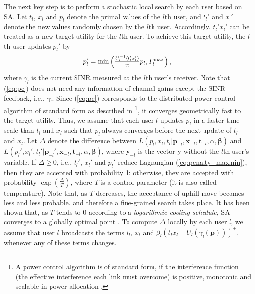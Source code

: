 \documentclass[10pt,journal,letterpaper,compsoc]{IEEEtran}
\begin{document}
{{The next key step is to perform a stochastic local search by each user based on SA. Let $t_l$, $x_l$ and $p_l$ denote the primal values of the $l$th user, and $t_l'$ and $x_l'$ denote the new values randomly chosen by the $l$th user. Accordingly, $t_l'x_l'$ can be treated as a new target utility for the $l$th user. To achieve this target utility, the $l$th user updates $p_l'$ by
\begin{equation}\begin{array}
[c]{lll}p_l'=\min\left(\frac{U_l^{-1}(t_l'x_l')}{\gamma_l}p_l,P_l^{\max}\right),
\end{array}
\label{eq:pc}
\end{equation}
where $\gamma_l$ is the current SINR measured at the $l$th user's receiver. Note that (\ref{eq:pc}) does not need any information of channel gains except the SINR feedback, i.e., $\gamma_l$. Since (\ref{eq:pc}) corresponds to the distributed power control algorithm of standard form as described in \cite{yates:1995}\footnote{A power control algorithm is of standard form, if the interference function (the effective interference each link must overcome) is positive, monotonic and scalable in power allocation \cite{yates:1995}.}, it converges geometrically fast to the target utility. Thus, we assume that each user $l$ updates $p_l$ in a faster time-scale than $t_l$ and $x_l$ such that $p_l$ always converges before the next update of $t_l$ and $x_l$.
Let $\Delta$ denote the difference between $L(p_l,x_l,t_l|\mathbf{p}_{-l},\mathbf{x}_{-l},\mathbf{t}_{-l},\alpha,\boldsymbol{\beta})$ and $L(p_l',x_l',t_l'|\mathbf{p}_{-l}',\mathbf{x}_{-l},\mathbf{t}_{-l},\alpha,\boldsymbol{\beta})$, where $\mathbf{y}_{-l}$ is the vector $\mathbf{y}$ without the $l$th user's variable. If $\Delta\ge 0$, i.e., $t_l'$, $x_l'$ and $p_l'$ reduce Lagrangian (\ref{eq:penalty_maxmin}), then they are accepted with probability 1; otherwise, they are accepted with probability $\exp\left(\frac{\Delta}{T}\right)$, where $T$ is a control parameter (it is also called temperature). Note that, as $T$ decreases, the acceptance of uphill move becomes less and less probable, and therefore a fine-grained search takes place. It has been shown that, as $T$ tends to 0 according to a \emph{logarithmic cooling schedule}, SA converges to a globally optimal point \cite{geman:1984,hajek:1988}. To compute $\Delta$ locally by each user $l$, we assume that user $l$ broadcasts the terms $t_l$, $x_l$ and $\beta_l(t_lx_l- U_l(\gamma_l(\mathbf{p})))^{+}$, whenever any of these terms changes.


}}
\end{document}
